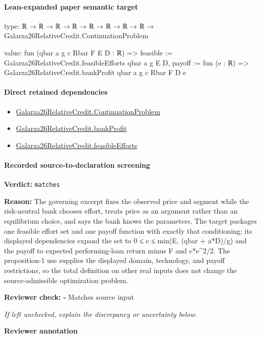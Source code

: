 \documentclass[10pt]{article}
\newcommand{\reviewerbox}{%
  \par\noindent\fbox{\parbox{0.96\linewidth}{\rule{0pt}{0.38in}}}\par
}
\newcommand{\reviewmatch}[1]{%
  \par\noindent\textbf{Reviewer check:} $\square$\; #1\par
  \noindent\emph{If left unchecked, explain the discrepancy or uncertainty below.}\par
}
\begin{document}
\paragraph{Lean-expanded paper semantic target}
\begin{ReviewVerbatim}
type:
ℝ → ℝ → ℝ → ℝ → ℝ → ℝ → ℝ → ℝ → Galarza26RelativeCredit.ContinuationProblem

value:
fun (qbar a g c Rbar F E D : ℝ) =>
  { feasible := Galarza26RelativeCredit.feasibleEfforts qbar a g E D,
    payoff := fun (e : ℝ) => Galarza26RelativeCredit.bankProfit qbar a g c Rbar F D e }
\end{ReviewVerbatim}

\paragraph{Direct retained dependencies}
\begin{itemize}\raggedright
\item \hyperlink{governing-declaration-34d15e1983b4c930}{Galarza26\allowbreak{}Relative\allowbreak{}Credit.\allowbreak{}Continuation\allowbreak{}Problem}
\item \hyperlink{paper-prerequisite-646bdd87bd4c2b85}{Galarza26\allowbreak{}Relative\allowbreak{}Credit.\allowbreak{}bank\allowbreak{}Profit}
\item \hyperlink{paper-prerequisite-3564270d1ab44650}{Galarza26\allowbreak{}Relative\allowbreak{}Credit.\allowbreak{}feasible\allowbreak{}Efforts}
\end{itemize}
\paragraph{Recorded source-to-declaration screening}
\textbf{Verdict:} \texttt{matches}
\\
{\raggedright
\textbf{Reason:} The governing excerpt fixes the observed price and segment while the risk-\allowbreak{}neutral bank chooses effort, treats price as an argument rather than an equilibrium choice, and says the bank knows the parameters.\allowbreak{} The target packages one feasible effort set and one payoff function with exactly that conditioning;\allowbreak{} its displayed dependencies expand the set to 0 ≤ e ≤ min(E, (qbar + a*D)/\allowbreak{}g) and the payoff to expected performing-\allowbreak{}loan return minus F and c*e\textasciicircum{}2/\allowbreak{}2.\allowbreak{} The proposition-\allowbreak{}1 use supplies the displayed domain, technology, and payoff restrictions, so the total definition on other real inputs does not change the source-\allowbreak{}admissible optimization problem.\allowbreak{}
\par}
\reviewmatch{Matches source input}
\noindent\textbf{Reviewer annotation}\par
\reviewerbox
\clearpage
\hypertarget{paper-prerequisite-0bf7e0c122a51179}{}
\end{document}
